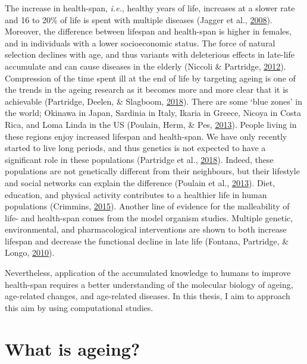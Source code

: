 \documentclass[12pt,twoside]{unicam}
\begin{document}
The increase in health-span, \emph{i.e.}, healthy years of life, increases at a slower rate and 16 to 20\% of life is spent with multiple diseases (Jagger et al., \protect\hyperlink{ref-Jagger2008}{2008}). Moreover, the difference between lifespan and health-span is higher in females, and in individuals with a lower socioeconomic status. The force of natural selection declines with age, and thus variants with deleterious effects in late-life accumulate and can cause diseases in the elderly (Niccoli \& Partridge, \protect\hyperlink{ref-Niccoli2012}{2012}). Compression of the time spent ill at the end of life by targeting ageing is one of the trends in the ageing research as it becomes more and more clear that it is achievable (Partridge, Deelen, \& Slagboom, \protect\hyperlink{ref-Partridge2018}{2018}). There are some `blue zones' in the world; Okinawa in Japan, Sardinia in Italy, Ikaria in Greece, Nicoya in Costa Rica, and Loma Linda in the US (Poulain, Herm, \& Pes, \protect\hyperlink{ref-Poulain2013}{2013}). People living in these regions enjoy increased lifespan and health-span. We have only recently started to live long periods, and thus genetics is not expected to have a significant role in these populations (Partridge et al., \protect\hyperlink{ref-Partridge2018}{2018}). Indeed, these populations are not genetically different from their neighbours, but their lifestyle and social networks can explain the difference (Poulain et al., \protect\hyperlink{ref-Poulain2013}{2013}). Diet, education, and physical activity contributes to a healthier life in human populations (Crimmins, \protect\hyperlink{ref-Crimmins2015}{2015}). Another line of evidence for the malleability of life- and health-span comes from the model organism studies. Multiple genetic, environmental, and pharmacological interventions are shown to both increase lifespan and decrease the functional decline in late life (Fontana, Partridge, \& Longo, \protect\hyperlink{ref-Fontana2010}{2010}).

Nevertheless, application of the accumulated knowledge to humans to improve health-span requires a better understanding of the molecular biology of ageing, age-related changes, and age-related diseases. In this thesis, I aim to approach this aim by using computational studies.

\hypertarget{introWhatAgeing}{%
\section{What is ageing?}\label{introWhatAgeing}}
\end{document}
